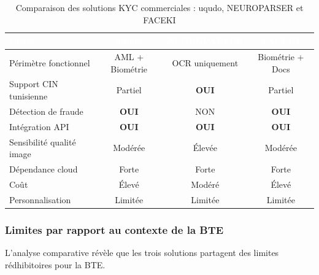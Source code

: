 \begin{table}[H]
  \centering
  \small
  \begin{tabular}{|l|c|c|c|}
    \toprule
    \rowcolor{bleu_principal}
    \textcolor{white}{\textbf{Critère}} & \textcolor{white}{\textbf{uqudo}} & \textcolor{white}{\textbf{NEUROPARSER}} & \textcolor{white}{\textbf{FACEKI}} \\
    \midrule
    Périmètre fonctionnel & AML + Biométrie & OCR uniquement & Biométrie + Docs \\
    \midrule
    \rowcolor{gris_leger}
    Support CIN tunisienne & Partiel & \textbf{OUI} & Partiel \\
    \midrule
    Détection de fraude & \textbf{OUI} & NON & \textbf{OUI} \\
    \midrule
    \rowcolor{gris_leger}
    Intégration API & \textbf{OUI} & \textbf{OUI} & \textbf{OUI} \\
    \midrule
    Sensibilité qualité image & Modérée & Élevée & Modérée \\
    \midrule
    \rowcolor{gris_leger}
    Dépendance cloud & Forte & Forte & Forte \\
    \midrule
    Coût & Élevé & Modéré & Élevé \\
    \midrule
    \rowcolor{gris_leger}
    Personnalisation & Limitée & Limitée & Limitée \\
    \bottomrule
  \end{tabular}
  \caption{Comparaison des solutions KYC commerciales : uqudo, NEUROPARSER et FACEKI}
  \label{tab:solutions-kyc}
\end{table}

\subsubsection{Limites par rapport au contexte de la BTE}

L'analyse comparative révèle que les trois solutions partagent des limites rédhibitoires pour la BTE.

